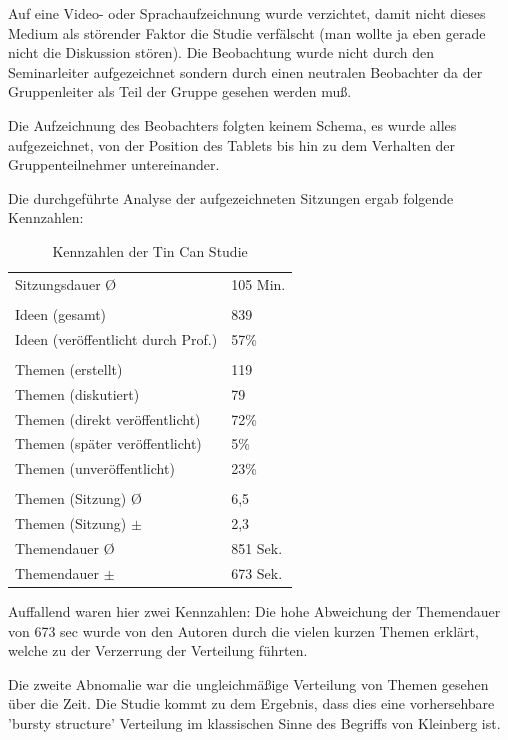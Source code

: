 Auf eine Video- oder Sprachaufzeichnung wurde verzichtet, damit nicht dieses
Medium als störender Faktor die Studie \cite{HarGorSch2012} verfälscht (man wollte ja eben gerade
nicht die Diskussion stören). Die Beobachtung wurde nicht durch den
Seminarleiter aufgezeichnet sondern durch einen neutralen Beobachter da der
Gruppenleiter als Teil der Gruppe gesehen werden muß.

Die Aufzeichnung des Beobachters folgten keinem Schema, es wurde alles
aufgezeichnet, von der Position des Tablets bis hin zu dem Verhalten der
Gruppenteilnehmer untereinander.

Die durchgeführte Analyse der aufgezeichneten Sitzungen ergab folgende Kennzahlen:

\begin{table}[htp]
  \begin{tabular}{ l  l }
    Sitzungsdauer \O & 105 Min.\\
    \\
    Ideen  (gesamt) &  839 \\
    Ideen  (veröffentlicht durch Prof.) & 57\% \\
    \\
    Themen (erstellt) & 119 \\
    Themen (diskutiert) & 79 \\
    Themen (direkt veröffentlicht) & 72\% \\
    Themen (später veröffentlicht) & 5\% \\ 
    Themen (unveröffentlicht) & 23\% \\
    \\
    Themen (Sitzung) \O & 6,5 \\
    Themen (Sitzung) $\pm$ & 2,3 \\
    Themendauer \O & 851 Sek. \\
    Themendauer $\pm$ & 673 Sek. \\
  \end{tabular}
  \caption{Kennzahlen der Tin Can Studie}
\end{table}

Auffallend waren hier zwei Kennzahlen: Die hohe Abweichung der Themendauer von
673  sec wurde von den Autoren durch die vielen kurzen Themen erklärt, welche zu
der Verzerrung der Verteilung führten.

Die zweite Abnomalie war die ungleichmäßige Verteilung von Themen gesehen über
die Zeit. Die Studie\cite{HarGorSch2012} kommt zu dem Ergebnis, dass dies eine vorhersehbare 'bursty
structure' Verteilung im klassischen Sinne des Begriffs von Kleinberg
\cite{Klei2003} ist.

